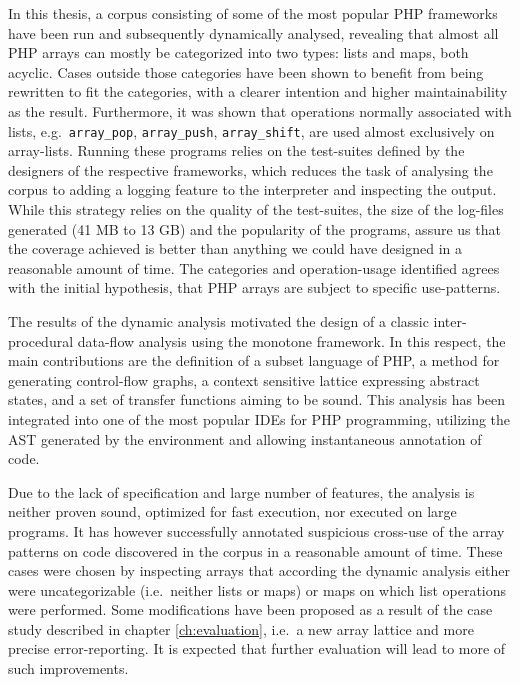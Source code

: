 

In this thesis, a corpus consisting of some of the most popular PHP frameworks have been run and subsequently dynamically analysed, revealing that almost all PHP arrays can mostly be categorized into two types: lists and maps, both acyclic. Cases outside those categories have been shown to benefit from being rewritten to fit the categories, with a clearer intention and higher maintainability as the result. Furthermore, it was shown that operations normally associated with lists, e.g.\ \texttt{array\_pop}, \texttt{array\_push}, \texttt{array\_shift}, are used almost exclusively on array-lists. Running these programs relies on the test-suites defined by the designers of the respective frameworks, which reduces the task of analysing the corpus to adding a logging feature to the interpreter and inspecting the output. While this strategy relies on the quality of the test-suites, the size of the log-files generated (41 MB to 13 GB) and the popularity of the programs, assure us that the coverage achieved is better than anything we could have designed in a reasonable amount of time. The categories and operation-usage identified agrees with the initial hypothesis, that PHP arrays are subject to specific use-patterns. 


The results of the dynamic analysis motivated the design of a classic inter-procedural data-flow analysis using the monotone framework. In this respect, the main contributions are the definition of a subset language of PHP, a method for generating control-flow graphs, a context sensitive lattice expressing abstract states, and a set of transfer functions aiming to be sound. This analysis has been integrated into one of the most popular IDEs for PHP programming, utilizing the AST generated by the environment and allowing instantaneous annotation of code. 

Due to the lack of specification and large number of features, the analysis is neither proven sound, optimized for fast execution, nor executed on large programs. It has however successfully annotated suspicious cross-use of the array patterns on code discovered in the corpus in a reasonable amount of time. These cases were chosen by inspecting arrays that according the dynamic analysis either were uncategorizable (i.e.\ neither lists or maps) or maps on which list operations were performed. Some modifications have been proposed as a result of the case study described in chapter \ref{ch:evaluation}, i.e.\ a new array lattice and more precise error-reporting. It is expected that further evaluation will lead to more of such improvements.

